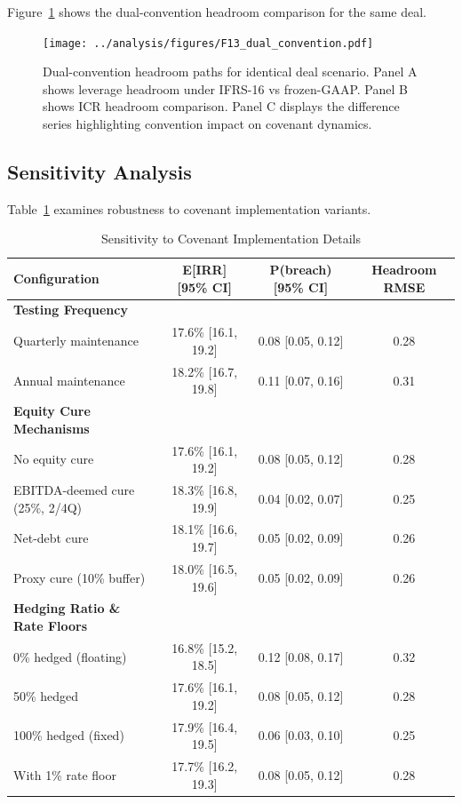 \documentclass[11pt,a4paper]{article}
\begin{document}
Figure~\ref{fig:dual_convention} shows the dual-convention headroom comparison for the same deal.

\begin{figure}[h]
\centering
\texttt{[image: ../analysis/figures/F13\_dual\_convention.pdf]}
\caption{Dual-convention headroom paths for identical deal scenario. Panel A shows leverage headroom under IFRS-16 vs frozen-GAAP. Panel B shows ICR headroom comparison. Panel C displays the difference series highlighting convention impact on covenant dynamics.}
\label{fig:dual_convention}
\end{figure}

\subsection{Sensitivity Analysis}

Table~\ref{tab:sensitivity} examines robustness to covenant implementation variants.

\begin{table}[h]
\centering
\caption{Sensitivity to Covenant Implementation Details}
\begin{tabular}{lccc}
\toprule
Configuration & E[IRR] [95\% CI] & P(breach) [95\% CI] & Headroom RMSE \\
\midrule
\textbf{Testing Frequency} & & & \\
Quarterly maintenance & 17.6\% [16.1, 19.2] & 0.08 [0.05, 0.12] & 0.28 \\
Annual maintenance & 18.2\% [16.7, 19.8] & 0.11 [0.07, 0.16] & 0.31 \\
\textbf{Equity Cure Mechanisms} & & & \\
No equity cure & 17.6\% [16.1, 19.2] & 0.08 [0.05, 0.12] & 0.28 \\
EBITDA-deemed cure (25\%, 2/4Q) & 18.3\% [16.8, 19.9] & 0.04 [0.02, 0.07] & 0.25 \\
Net-debt cure & 18.1\% [16.6, 19.7] & 0.05 [0.02, 0.09] & 0.26 \\
Proxy cure (10\% buffer) & 18.0\% [16.5, 19.6] & 0.05 [0.02, 0.09] & 0.26 \\
\textbf{Hedging Ratio \& Rate Floors} & & & \\
0\% hedged (floating) & 16.8\% [15.2, 18.5] & 0.12 [0.08, 0.17] & 0.32 \\
50\% hedged & 17.6\% [16.1, 19.2] & 0.08 [0.05, 0.12] & 0.28 \\
100\% hedged (fixed) & 17.9\% [16.4, 19.5] & 0.06 [0.03, 0.10] & 0.25 \\
With 1\% rate floor & 17.7\% [16.2, 19.3] & 0.08 [0.05, 0.12] & 0.28 \\
\bottomrule
\end{tabular}
\label{tab:sensitivity}
\end{table}
\end{document}

